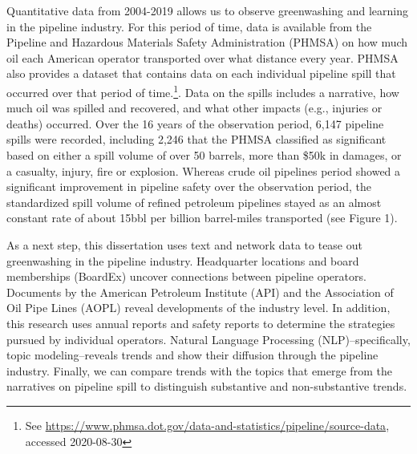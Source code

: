 Quantitative data from 2004-2019 allows us to observe greenwashing and learning in the pipeline industry. For this period of time, data is available from the Pipeline and Hazardous Materials Safety Administration (PHMSA) on how much oil each American operator transported over what distance every year. PHMSA also provides a dataset that contains data on each individual pipeline spill that occurred over that period of time.\footnote{See \url{https://www.phmsa.dot.gov/data-and-statistics/pipeline/source-data}, accessed 2020-08-30}. Data on the spills includes a narrative, how much oil was spilled and recovered, and what other impacts (e.g., injuries or deaths) occurred. Over the 16 years of the observation period, 6,147 pipeline spills were recorded, including 2,246 that the PHMSA classified as significant based on either a spill volume of over 50 barrels, more than \$50k in damages, or a casualty, injury, fire or explosion. Whereas crude oil pipelines period showed a significant improvement in pipeline safety over the observation period, the standardized spill volume of refined petroleum pipelines stayed as an almost constant rate of about 15bbl per billion barrel-miles transported (see Figure 1). 

As a next step, this dissertation uses text and network data to tease out greenwashing in the pipeline industry. Headquarter locations and board memberships (BoardEx) uncover connections between pipeline operators. Documents by the American Petroleum Institute (API) and the Association of Oil Pipe Lines (AOPL) reveal developments of the industry level. In addition, this research uses annual reports and safety reports to determine the strategies pursued by individual operators. Natural Language Processing (NLP)--specifically, topic modeling--reveals trends and show their diffusion through the pipeline industry. Finally, we can compare trends with the topics that emerge from the narratives on pipeline spill to distinguish substantive and non-substantive trends.

